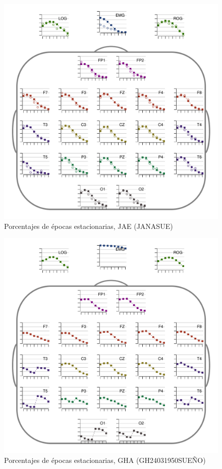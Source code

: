 \begin{figure}
\centering
\includegraphics[width=.9\linewidth]{./img_resultados/JANASUE_cabeza_epocas_.pdf}
\caption{Porcentajes de épocas estacionarias, JAE (JANASUE)}
\end{figure}

\begin{figure}
\centering
\includegraphics[width=.9\linewidth]{./img_resultados/GH24031950SUENO_cabeza_epocas_.pdf}
\caption{Porcentajes de épocas estacionarias, GHA (GH24031950SUEÑO)}
\end{figure}

